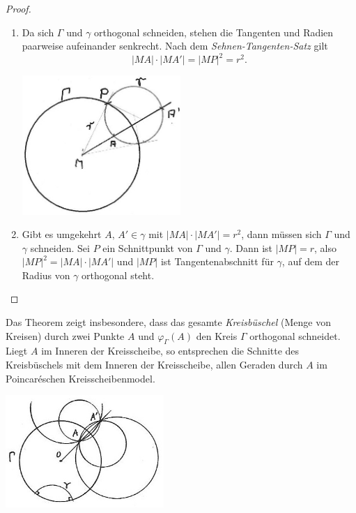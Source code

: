\begin{proof}
    \renewcommand{\labelenumi}{\alph{enumi})} %
    \begin{enumerate}
        \item Da sich $\Gamma$ und $\gamma$ orthogonal schneiden, stehen die Tangenten und Radien
            paarweise aufeinander senkrecht. Nach dem {\em Sehnen-Tangenten-Satz}
            gilt
            $$
                |MA| \cdot |MA'| = |MP|^2 = r^2.
            $$
            \centerline{\includegraphics[width=6cm]{BILDER/4-2-02b-Inversion.jpg}}

        \item Gibt es umgekehrt $A,\, A' \in \gamma$ mit $|MA| \cdot |MA'| = r^2$, dann müssen sich
            $\Gamma$ und $\gamma$ schneiden. Sei $P$ ein Schnittpunkt von $\Gamma$ und $\gamma$.
            Dann ist $|MP| = r$, also $|MP|^2 = |MA| \cdot |MA'|$ und $|MP|$ ist Tangentenabschnitt
            für $\gamma$, auf dem der Radius von $\gamma$ orthogonal steht.
    \end{enumerate}
\end{proof}

Das Theorem zeigt insbesondere, dass das gesamte {\em Kreisbüschel} (Menge von Kreisen) durch zwei
Punkte $A$ und $\varphi_\Gamma(A)$ den Kreis $\Gamma$ orthogonal schneidet. Liegt $A$ im Inneren
der Kreisscheibe, so entsprechen die Schnitte des Kreisbüschels mit dem Inneren der Kreisscheibe,
allen Geraden durch $A$ im Poincaréschen Kreisscheibenmodel.

\centerline{\includegraphics[width=6cm]{BILDER/4-2-06-Parallel.jpg}}

